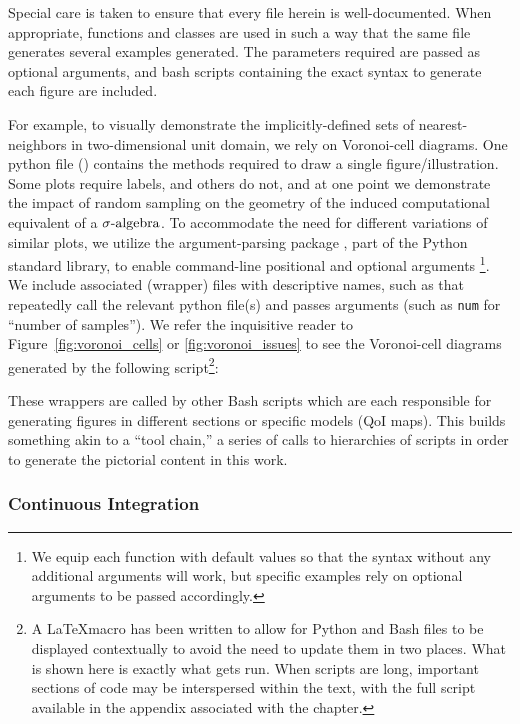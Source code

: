 Special care is taken to ensure that every file herein is well-documented.
When appropriate, functions and classes are used in such a way that the same file generates several examples generated.
The parameters required are passed as optional arguments, and bash scripts containing the exact syntax to generate each figure are included.

For example, to visually demonstrate the implicitly-defined sets of nearest-neighbors in two-dimensional unit domain, we rely on Voronoi-cell diagrams.
One python file () contains the methods required to draw a single figure/illustration.
Some plots require labels, and others do not, and at one point we demonstrate the impact of random sampling on the geometry of the induced computational equivalent of a $\sigma\text{-algebra}$.
To accommodate the need for different variations of similar plots, we utilize the argument-parsing package , part of the Python standard library, to enable command-line positional and optional arguments \footnote{We equip each function with default values so that the syntax  without any additional arguments will work, but specific examples rely on optional arguments to be passed accordingly.}.
We include associated (wrapper) files with descriptive names, such as  that repeatedly call the relevant python file(s) and passes arguments (such as {\tt num} for ``number of samples'').
We refer the inquisitive reader to  Figure~\ref{fig:voronoi_cells} or \ref{fig:voronoi_issues} to see the Voronoi-cell diagrams generated by the following script\footnote{A \LaTeX macro has been written to allow for Python and Bash files to be displayed contextually to avoid the need to update them in two places. What is shown here is exactly what gets run. When scripts are long, important sections of code may be interspersed within the text, with the full script available in the appendix associated with the chapter.}:



These wrappers are called by other Bash scripts which are each responsible for generating figures in different sections or specific models (QoI maps).
This builds something akin to a ``tool chain,'' a series of calls to hierarchies of scripts in order to generate the pictorial content in this work.


\subsubsection{Continuous Integration}\label{sec:continuous-integration}


